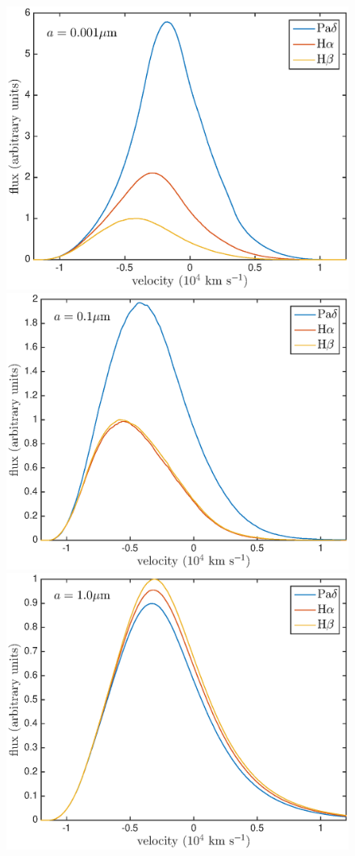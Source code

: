 \documentclass[useAMS,usenatbib,usegraphicx]{mnras}
\begin{document}
\begin{figure}
\vspace{1mm}\includegraphics[trim=-18 0 0 0,clip=true,scale=0.34]{a0_001_opt_thick_HaHbPad}
\includegraphics[trim=18 0 0 0,clip=true,scale=0.34]{a0_1_opt_thick_HaHbPad}
\includegraphics[trim=18 0 0 0,clip=true,scale=0.34]{a1_opt_thick_HaHbPad}

\end{figure}
\end{document}
